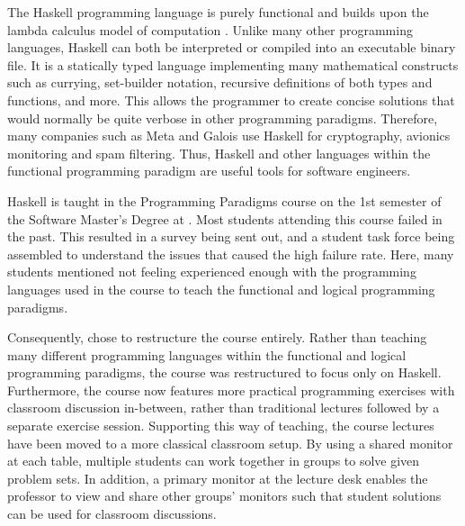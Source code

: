 The Haskell programming language is purely functional\cite{} and builds upon the lambda calculus model of computation \cite{}.
Unlike many other programming languages, Haskell can both be interpreted or compiled into an executable binary file.
It is a statically typed language implementing many mathematical constructs such as currying, set-builder notation, recursive definitions of both types and functions, and more.
This allows the programmer to create concise solutions that would normally be quite verbose in other programming paradigms.
Therefore, many companies such as Meta and Galois use Haskell for cryptography, avionics monitoring and spam filtering.
Thus, Haskell and other languages within the functional programming paradigm are useful tools for software engineers.


Haskell is taught in the Programming Paradigms course on the 1st semester of the Software Master's Degree at \aau{}.
Most students attending this course failed in the past.
This resulted in a survey being sent out, and a student task force being assembled to understand the issues that caused the high failure rate.
Here, many students mentioned not feeling experienced enough with the programming languages used in the course to teach the functional and logical programming paradigms.


Consequently, \aau{} chose to restructure the course entirely.
Rather than teaching many different programming languages within the functional and logical programming paradigms, the course was restructured to focus only on Haskell.
Furthermore, the course now features more practical programming exercises with classroom discussion in-between, rather than traditional lectures followed by a separate exercise session.
Supporting this way of teaching, the course lectures have been moved to a more classical classroom setup.
By using a shared monitor at each table, multiple students can work together in groups to solve given problem sets.
In addition, a primary monitor at the lecture desk enables the professor to view and share other groups' monitors such that student solutions can be used for classroom discussions.


